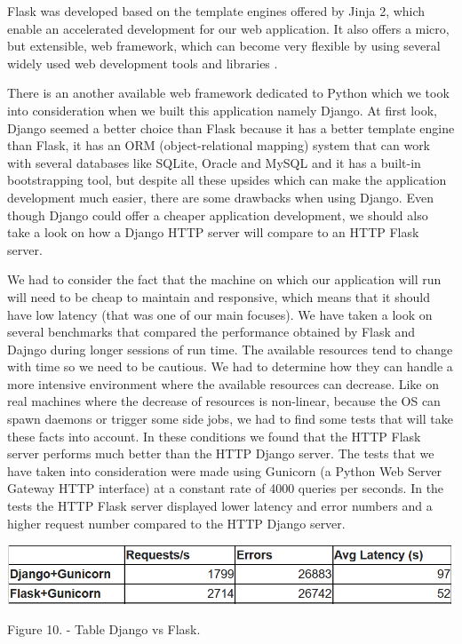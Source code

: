 \documentclass[12pt, a4paper]{report}
\begin{document}
Flask was developed based on the template engines offered by Jinja 2, which enable an accelerated development for our web application. It also offers a micro, but extensible, web framework, which can become very flexible by using several widely used web development tools and libraries \cite{Flask1}.
\par 

There is an another available web framework dedicated to Python which we took into consideration when we built this application namely Django. At first look, Django seemed a better choice than Flask because it has a better template engine than Flask, it has an ORM (object-relational mapping) system that can work with several databases like SQLite, Oracle and MySQL and it has a built-in bootstrapping tool, but despite all these upsides which can make the application development much easier, there are some drawbacks when using Django. Even though Django could offer a cheaper application development, we should also take a look on how a Django HTTP server will compare to an HTTP Flask server.
\par 

We had to consider the fact that the machine on which our application will run will need to be cheap to maintain and responsive, which means that it should have low latency (that was one of our main focuses). We have taken a look on several benchmarks that compared the performance obtained by Flask and Dajngo during longer sessions of run time. The available resources tend to change with time so we need to be cautious. We had to determine how they can handle a more intensive environment where the available resources can decrease. Like on real machines where the decrease of resources is non-linear, because the OS can spawn daemons or trigger some side jobs, we had to find some tests that will take these facts into account. In these conditions we found that the HTTP Flask server performs much better than the HTTP Django server. The tests that we have taken into consideration \cite{Flask2} were made using Gunicorn (a Python Web Server Gateway HTTP interface) at a constant rate of 4000 queries per seconds. In the tests the HTTP Flask server displayed lower latency and error numbers and a higher request number compared to the HTTP Django server.
\par 

\bigskip
\includegraphics[scale=0.6, center]{django-flask-table.png}
\begin{center}
Figure 10. \cite{Flask2} - Table Django vs Flask.
\end{center}
\end{document}
